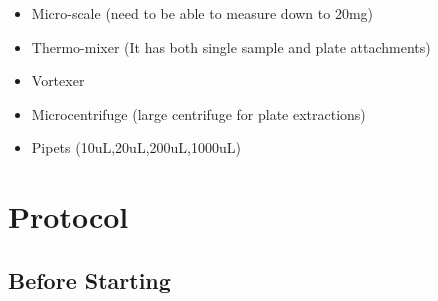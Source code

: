\documentclass[
  letterpaper,
  DIV=11,
  numbers=noendperiod]{scrreprt}
\begin{document}
\begin{itemize}
\item
  Micro-scale (need to be able to measure down to 20mg)
\item
  Thermo-mixer (It has both single sample and plate attachments)
\item
  Vortexer
\item
  Microcentrifuge (large centrifuge for plate extractions)
\item
  Pipets (10uL,20uL,200uL,1000uL)
\end{itemize}

\hypertarget{protocol-1}{%
\section*{\texorpdfstring{\textbf{Protocol}}{Protocol}}\label{protocol-1}}


\hypertarget{before-starting}{%
\subsection*{\texorpdfstring{\textbf{Before
Starting}}{Before Starting}}\label{before-starting}}
\end{document}
